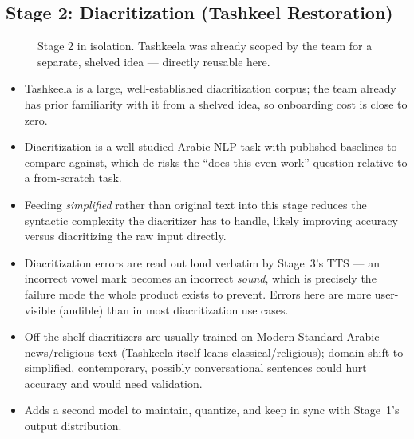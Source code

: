 \documentclass[11pt,a4paper]{article}
\newcommand{\proscons}[2]{%
  \begin{minipage}[t]{0.485\textwidth}
    \begin{prosbox}
      \begin{itemize}[leftmargin=1.1em,itemsep=1pt,topsep=1pt]
        #1
      \end{itemize}
    \end{prosbox}
  \end{minipage}\hfill
  \begin{minipage}[t]{0.485\textwidth}
    \begin{consbox}
      \begin{itemize}[leftmargin=1.1em,itemsep=1pt,topsep=1pt]
        #2
      \end{itemize}
    \end{consbox}
  \end{minipage}
}
\begin{document}
\subsection{Stage 2: Diacritization (Tashkeel Restoration)}

\begin{figure}[h!]
\centering
{}
\caption{Stage 2 in isolation. Tashkeela was already scoped by the team for a
separate, shelved idea --- directly reusable here.}
\label{fig:stage2}
\end{figure}

\proscons{
  \item Tashkeela is a large, well-established diacritization corpus; the team
  already has prior familiarity with it from a shelved idea, so onboarding cost
  is close to zero.
  \item Diacritization is a well-studied Arabic NLP task with published
  baselines to compare against, which de-risks the ``does this even work''
  question relative to a from-scratch task.
  \item Feeding \emph{simplified} rather than original text into this stage
  reduces the syntactic complexity the diacritizer has to handle, likely
  improving accuracy versus diacritizing the raw input directly.
}{
  \item Diacritization errors are read out loud verbatim by Stage~3's TTS --- an
  incorrect vowel mark becomes an incorrect \emph{sound}, which is precisely the
  failure mode the whole product exists to prevent. Errors here are more
  user-visible (audible) than in most diacritization use cases.
  \item Off-the-shelf diacritizers are usually trained on Modern Standard Arabic
  news/religious text (Tashkeela itself leans classical/religious); domain shift
  to simplified, contemporary, possibly conversational sentences could hurt
  accuracy and would need validation.
  \item Adds a second model to maintain, quantize, and keep in sync with Stage~1's
  output distribution.
}
\end{document}
